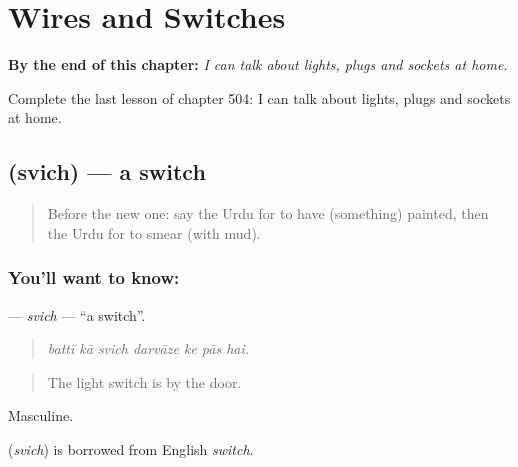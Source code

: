 
\chapter{Wires and Switches}
\label{ch:ur-wires-and-switches}

\begin{chapteropening}
\textbf{By the end of this chapter:} \emph{I can talk about lights, plugs and sockets at home.}

Complete the last lesson of chapter 504: I can talk about lights, plugs and sockets at home.
\end{chapteropening}

\section[\texorpdfstring{\ur{سوئچ} (svich)}{سوئچ (svich)}]{ (svich) — a switch}

\label{lesson:UR-C504-svich}



\begin{quote}
Before the new one: say the Urdu for to have (something) painted, then the Urdu for to smear (with mud).
\end{quote}

\subsection*{You'll want to know: }
\textbf{} — \emph{svich} — \textquotedblleft{}a switch\textquotedblright{}.

\begin{quote}
      
\end{quote}

\begin{quote}
\emph{battī kā svich darvāze ke pās hai.}
\end{quote}

\begin{quote}
The light switch is by the door.
\end{quote}

Masculine.

\begin{cousinweb}
\textbf{} (\emph{svich}) is borrowed from English \emph{switch}.
\end{cousinweb}

